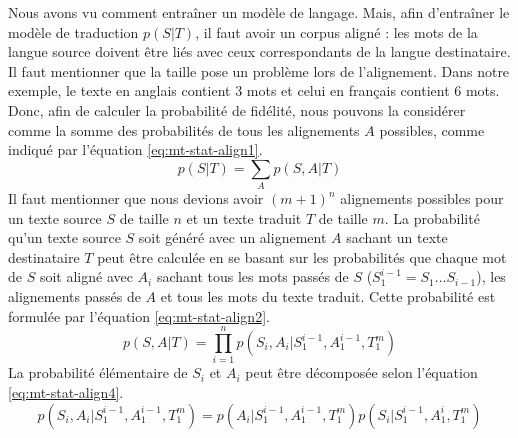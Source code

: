 \documentclass{KodeBook}
\begin{document}
Nous avons vu comment entraîner un modèle de langage. 
Mais, afin d'entraîner le modèle de traduction $p(S|T)$, il faut avoir un corpus aligné : les mots de la langue source doivent être liés avec ceux correspondants de la langue destinataire.
Il faut mentionner que la taille pose un problème lors de l'alignement. 
Dans notre exemple, le texte en anglais contient 3 mots et celui en français contient 6 mots.
Donc, afin de calculer la probabilité de fidélité, nous pouvons la considérer comme la somme des probabilités de tous les alignements $A$ possibles, comme indiqué par l'équation \ref{eq:mt-stat-align1}.
\begin{equation}\label{eq:mt-stat-align1}
p(S|T) = \sum_{A} p(S, A | T)
\end{equation}
Il faut mentionner que nous devions avoir $(m + 1)^n$ alignements possibles pour un texte source $S$ de taille $n$ et un texte traduit $T$ de taille $m$.
La probabilité qu'un texte source $S$ soit généré avec un alignement $A$ sachant un texte destinataire $T$ peut être calculée en se basant sur les probabilités que chaque mot de $S$ soit aligné avec $A_i$ sachant tous les mots passés de $S$ ($S_1^{i-1} = S_1 \ldots S_{i-1}$), les alignements passés de $A$ et tous les mots du texte traduit. 
Cette probabilité est formulée par l'équation \ref{eq:mt-stat-align2}.
\begin{equation}\label{eq:mt-stat-align2}
p(S, A | T) = \prod_{i=1}^{n} p(S_i, A_i | S_1^{i-1}, A_1^{i-1}, T_1^{m})
\end{equation}
La probabilité élémentaire de $S_i$ et $A_i$ peut être décomposée selon l'équation \ref{eq:mt-stat-align4}.
\begin{equation}\label{eq:mt-stat-align4}
p(S_i, A_i | S_1^{i-1}, A_1^{i-1}, T_1^{m}) = p(A_i | S_1^{i-1}, A_1^{i-1}, T_1^{m}) p(S_i | S_1^{i-1}, A_1^{i}, T_1^{m})
\end{equation}
\end{document}
